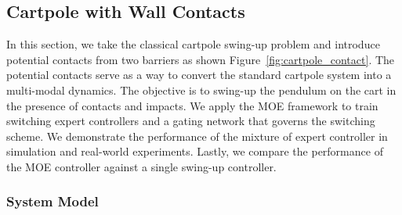 \subsection{Cartpole with Wall Contacts}
\label{ssec:cartpole_with_walls}

In this section, we take the classical cartpole swing-up problem and introduce
potential contacts from two barriers as shown Figure~\ref{fig:cartpole_contact}. 
%
The potential contacts serve as a way to convert the standard cartpole system
into a multi-modal dynamics.
%
The objective is to swing-up the pendulum on the cart in the presence of
contacts and impacts.
%
We apply the MOE framework to train switching expert controllers and a gating
network that governs the switching scheme.
%
We demonstrate the performance of the mixture of expert controller in
simulation and real-world experiments.
%
Lastly, we compare the performance of the MOE controller against
a single swing-up controller. 

\subsubsection{System Model}
\label{sssec:cartpole_model}

